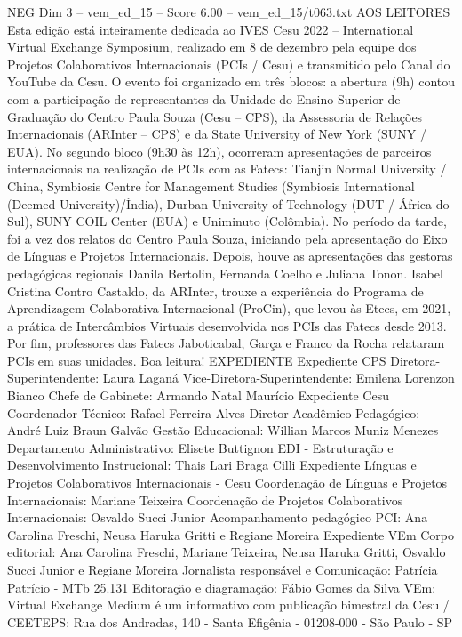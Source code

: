 \begin{textsample}{NEG Dim 3 – vem\_ed\_15 – Score 6.00 – vem\_ed\_15/t063.txt}  \label{ex:f3_neg_111}
AOS LEITORES Esta edição está inteiramente dedicada ao IVES Cesu 2022 – International Virtual Exchange Symposium, realizado em 8 de dezembro pela equipe dos Projetos Colaborativos Internacionais (PCIs / Cesu) e transmitido pelo Canal do YouTube da Cesu.
O evento foi organizado em três blocos: a abertura (9h) contou com a participação de representantes da Unidade do Ensino Superior de Graduação do Centro Paula Souza (Cesu – CPS), da Assessoria de Relações Internacionais (ARInter – CPS) e da State University of New York (SUNY / EUA).
No segundo bloco (9h30 às 12h), ocorreram apresentações de parceiros internacionais na realização de PCIs com as Fatecs: Tianjin Normal University / China, Symbiosis Centre for Management Studies (Symbiosis International (Deemed University)/Índia), Durban University of Technology (DUT / África do Sul), SUNY COIL Center (EUA) e Uniminuto (Colômbia).
No período da tarde, foi a vez dos relatos do Centro Paula Souza, iniciando pela apresentação do Eixo de Línguas e Projetos Internacionais.
Depois, houve as apresentações das gestoras pedagógicas regionais Danila Bertolin, Fernanda Coelho e Juliana Tonon.
Isabel Cristina Contro Castaldo, da ARInter, trouxe a experiência do Programa de Aprendizagem Colaborativa Internacional (ProCin), que levou às Etecs, em 2021, a prática de Intercâmbios Virtuais desenvolvida nos PCIs das Fatecs desde 2013.
Por fim, professores das Fatecs Jaboticabal, Garça e Franco da Rocha relataram PCIs em suas unidades.
Boa leitura!
EXPEDIENTE Expediente CPS Diretora-Superintendente: Laura Laganá Vice-Diretora-Superintendente: Emilena Lorenzon Bianco Chefe de Gabinete: Armando Natal Maurício Expediente Cesu Coordenador Técnico: Rafael Ferreira Alves Diretor Acadêmico-Pedagógico: André Luiz Braun Galvão Gestão Educacional: Willian Marcos Muniz Menezes Departamento Administrativo: Elisete Buttignon EDI - Estruturação e Desenvolvimento Instrucional: Thais Lari Braga Cilli Expediente Línguas e Projetos Colaborativos Internacionais - Cesu Coordenação de Línguas e Projetos Internacionais: Mariane Teixeira Coordenação de Projetos Colaborativos Internacionais: Osvaldo Succi Junior Acompanhamento pedagógico PCI: Ana Carolina Freschi, Neusa Haruka Gritti e Regiane Moreira Expediente VEm Corpo editorial: Ana Carolina Freschi, Mariane Teixeira, Neusa Haruka Gritti, Osvaldo Succi Junior e Regiane Moreira Jornalista responsável e Comunicação: Patrícia Patrício - MTb 25.131 Editoração e diagramação: Fábio Gomes da Silva VEm: Virtual Exchange Medium é um informativo com publicação bimestral da Cesu / CEETEPS: Rua dos Andradas, 140 - Santa Efigênia - 01208-000 - São Paulo - SP

\end{textsample}
